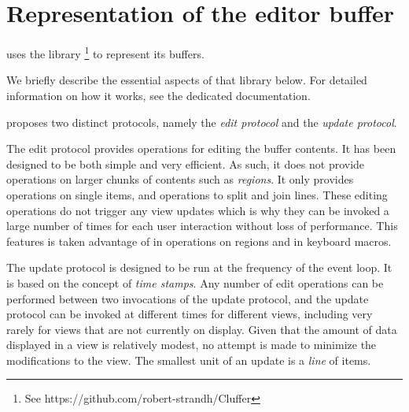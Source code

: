 \chapter{Representation of the editor buffer}
\label{chap-internals-buffer}

\sysname{} uses the \cluffer{} library%
\footnote{See https://github.com/robert-strandh/Cluffer}
to represent its buffers.

We briefly describe the essential aspects of that library below.  For
detailed information on how it works, see the dedicated documentation.

\cluffer{} proposes two distinct protocols, namely the \emph{edit
  protocol} and the \emph{update protocol}.

The edit protocol provides operations for editing the buffer
contents.  It has been designed to be both simple and very efficient.
As such, it does not provide operations on larger chunks of contents
such as \emph{regions}.  It only provides operations on single items,
and operations to split and join lines.  These editing operations do
not trigger any view updates which is why they can be invoked a large
number of times for each user interaction without loss of performance.
This features is taken advantage of in operations on regions and in
keyboard macros.

The update protocol is designed to be run at the frequency of the
event loop.  It is based on the concept of \emph{time stamps}.  Any
number of edit operations can be performed between two invocations of
the update protocol, and the update protocol can be invoked at
different times for different views, including very rarely for views
that are not currently on display.  Given that the amount of data
displayed in a view is relatively modest, no attempt is made to
minimize the modifications to the view.  The smallest unit of an
update is a \emph{line} of items.
